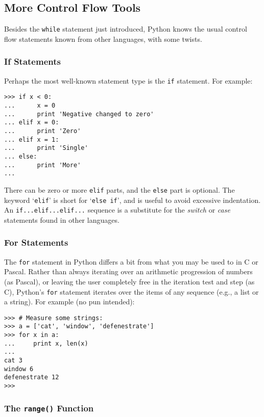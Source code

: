 \subsection{More Control Flow Tools}

Besides the {\tt while} statement just introduced, Python knows the
usual control flow statements known from other languages, with some
twists.

\subsubsection{If Statements}

Perhaps the most well-known statement type is the {\tt if} statement.
For example:
\bcode\begin{verbatim}
>>> if x < 0:
...      x = 0
...      print 'Negative changed to zero'
... elif x = 0:
...      print 'Zero'
... elif x = 1:
...      print 'Single'
... else:
...      print 'More'
... 
\end{verbatim}\ecode
There can be zero or more {\tt elif} parts, and the {\tt else} part is
optional.
The keyword `{\tt elif}' is short for `{\tt else if}', and is useful to
avoid excessive indentation.
An {\tt if...elif...elif...} sequence is a substitute for the
{\em switch} or {\em case} statements found in other languages.

\subsubsection{For Statements}

The {\tt for} statement in Python differs a bit from what you may be
used to in C or Pascal.
Rather than always iterating over an arithmetic progression of numbers
(as Pascal), or leaving the user completely free in the iteration test
and step (as C), Python's {\tt for} statement iterates over the items
of any sequence (e.g., a list or a string).
For example (no pun intended):
\bcode\begin{verbatim}
>>> # Measure some strings:
>>> a = ['cat', 'window', 'defenestrate']
>>> for x in a:
...     print x, len(x)
... 
cat 3
window 6
defenestrate 12
>>> 
\end{verbatim}\ecode

\subsubsection{The {\tt range()} Function}

